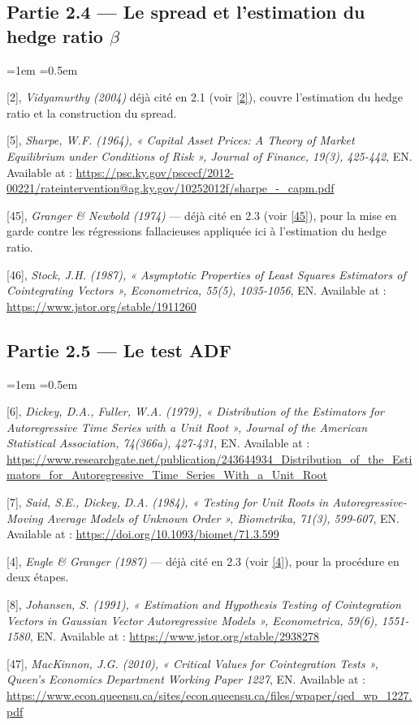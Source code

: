 \documentclass{article}
\begin{document}
\subsection*{Partie 2.4 --- Le spread et l'estimation du hedge ratio $\beta$}
\begin{list}{}{\leftmargin=1em \itemsep=0.5em}
\item \hypertarget{ref2}{} [2], \textit{Vidyamurthy (2004)} déjà cité en 2.1 (voir \hyperlink{ref2}{[2]}), couvre l'estimation du hedge ratio et la construction du spread.
\item \hypertarget{ref5}{} [5], \textit{Sharpe, W.F. (1964), « Capital Asset Prices: A Theory of Market Equilibrium under Conditions of Risk », Journal of Finance, 19(3), 425-442}, EN. Available at : \url{https://psc.ky.gov/pscecf/2012-00221/rateintervention@ag.ky.gov/10252012f/sharpe_-_capm.pdf}
\item \hypertarget{ref45}{} [45], \textit{Granger \& Newbold (1974)} --- déjà cité en 2.3 (voir \hyperlink{ref45}{[45]}), pour la mise en garde contre les régressions fallacieuses appliquée ici à l'estimation du hedge ratio.
\item \hypertarget{ref46}{} [46], \textit{Stock, J.H. (1987), « Asymptotic Properties of Least Squares Estimators of Cointegrating Vectors », Econometrica, 55(5), 1035-1056}, EN. Available at : \url{https://www.jstor.org/stable/1911260}
\end{list}
\subsection*{Partie 2.5 --- Le test ADF}
\begin{list}{}{\leftmargin=1em \itemsep=0.5em}
\item \hypertarget{ref6}{} [6], \textit{Dickey, D.A., Fuller, W.A. (1979), « Distribution of the Estimators for Autoregressive Time Series with a Unit Root », Journal of the American Statistical Association, 74(366a), 427-431}, EN. Available at : \url{https://www.researchgate.net/publication/243644934_Distribution_of_the_Estimators_for_Autoregressive_Time_Series_With_a_Unit_Root}
\item \hypertarget{ref7}{} [7], \textit{Said, S.E., Dickey, D.A. (1984), « Testing for Unit Roots in Autoregressive-Moving Average Models of Unknown Order », Biometrika, 71(3), 599-607}, EN. Available at : \url{https://doi.org/10.1093/biomet/71.3.599}
\item \hypertarget{ref4}{} [4], \textit{Engle \& Granger (1987)} --- déjà cité en 2.3 (voir \hyperlink{ref4}{[4]}), pour la procédure en deux étapes.
\item \hypertarget{ref8}{} [8], \textit{Johansen, S. (1991), « Estimation and Hypothesis Testing of Cointegration Vectors in Gaussian Vector Autoregressive Models », Econometrica, 59(6), 1551-1580}, EN. Available at : \url{https://www.jstor.org/stable/2938278}
\item \hypertarget{ref47}{} [47], \textit{MacKinnon, J.G. (2010), « Critical Values for Cointegration Tests », Queen's Economics Department Working Paper 1227}, EN. Available at : \url{https://www.econ.queensu.ca/sites/econ.queensu.ca/files/wpaper/qed_wp_1227.pdf}
\end{list}
\end{document}
